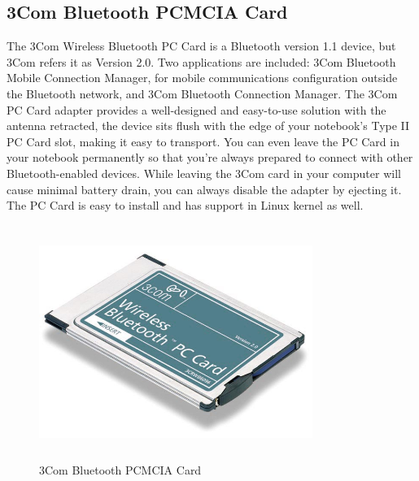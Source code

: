 \subsection{3Com Bluetooth PCMCIA Card}
The 3Com Wireless Bluetooth PC Card is a Bluetooth version 1.1 device, but 3Com refers it as Version 2.0. Two applications are included: 3Com Bluetooth Mobile Connection Manager, for mobile communications configuration outside the Bluetooth network, and 3Com Bluetooth Connection Manager. The 3Com PC Card adapter provides a well-designed and easy-to-use solution with the antenna retracted, the device sits flush with the edge of your notebook’s Type II PC Card slot, making it easy to transport. You can even leave the PC Card in your notebook permanently so that you’re always prepared to connect with other Bluetooth-enabled devices. While leaving the 3Com card in your computer will cause minimal battery drain, you can always disable the adapter by ejecting it.\\
The PC Card is easy to install and has support in Linux kernel as well.
\begin{figure}[ht]
	\centering
	\includegraphics[width=3.5in, height=3in]{images/3com_bluetooth.png}
	\caption{3Com Bluetooth PCMCIA Card}
\end{figure}
